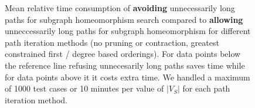 \begin{figure}
\begin{subfigure} {0.5\linewidth}

\end{subfigure}

\caption{Mean relative time consumption of \textbf{avoiding} unnecessarily long paths for subgraph homeomorphism search compared to \textbf{allowing} unneccessarily long paths for subgraph homeomorphism for different path iteration methods (no pruning or contraction, greatest constrained first / degree based orderings). For data points below the reference line refusing unnecesarily long paths saves time while for data points above it it costs extra time. We handled a maximum of 1000 test cases or 10 minutes per value of $|V_S|$ for each path iteration method.}	
\label{fig:longerpaths}
\end{figure}
